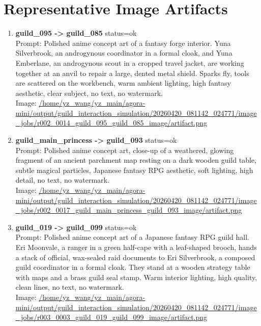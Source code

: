 \documentclass[11pt,a4paper]{article}
\begin{document}
\section{Representative Image Artifacts}
\begin{enumerate}
\item \textbf{guild\_095 -> guild\_085} status=ok\\\newline Prompt: Polished anime concept art of a fantasy forge interior. Yuna Silverbrook, an androgynous coordinator in a formal cloak, and Yuna Emberlane, an androgynous scout in a cropped travel jacket, are working together at an anvil to repair a large, dented metal shield. Sparks fly, tools are scattered on the workbench, warm ambient lighting, high fantasy aesthetic, clear subject, no text, no watermark.\\\newline Image: \url{/home/yz\_wang/yz\_main/agora-mini/output/guild\_interaction\_simulation/20260420\_081142\_024771/image\_jobs/r002\_0014\_guild\_095\_guild\_085\_image/artifact.png}
\item \textbf{guild\_main\_princess -> guild\_093} status=ok\\\newline Prompt: Polished anime concept art, close-up of a weathered, glowing fragment of an ancient parchment map resting on a dark wooden guild table, subtle magical particles, Japanese fantasy RPG aesthetic, soft lighting, high detail, no text, no watermark.\\\newline Image: \url{/home/yz\_wang/yz\_main/agora-mini/output/guild\_interaction\_simulation/20260420\_081142\_024771/image\_jobs/r002\_0017\_guild\_main\_princess\_guild\_093\_image/artifact.png}
\item \textbf{guild\_019 -> guild\_099} status=ok\\\newline Prompt: Polished anime concept art of a Japanese fantasy RPG guild hall. Eri Moonvale, a ranger in a green half-cape with a leaf-shaped brooch, hands a stack of official, wax-sealed raid documents to Eri Silverbrook, a composed guild coordinator in a formal cloak. They stand at a wooden strategy table with maps and a brass guild seal stamp. Warm interior lighting, high quality, clean lines, no text, no watermark.\\\newline Image: \url{/home/yz\_wang/yz\_main/agora-mini/output/guild\_interaction\_simulation/20260420\_081142\_024771/image\_jobs/r003\_0003\_guild\_019\_guild\_099\_image/artifact.png}

\end{enumerate}
\end{document}
